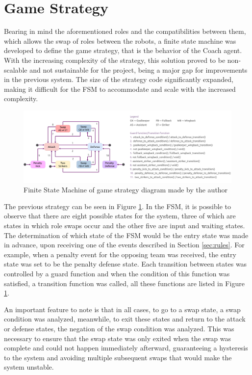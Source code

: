 \section{Game Strategy}

Bearing in mind the aforementioned roles and the compatibilities between them, which allows the swap of roles between the robots, a finite state machine was developed to define the game strategy, that is the behavior of the Coach agent. With the increasing complexity of the strategy, this solution proved to be non-scalable and not sustainable for the project, being a major gap for improvements in the previous system. The size of the strategy code significantly expanded, making it difficult for the FSM to accommodate and scale with the increased complexity.

\begin{figure}[!h]
    \centering
    \includegraphics[width=\linewidth]{chapters/target_system/images/BehaviorsController FSM.png}
    \caption{Finite State Machine of game strategy diagram made by the author}
    \label{fig:behaviors_controller_fsm}
\end{figure}

The previous strategy can be seen in Figure \ref{fig:behaviors_controller_fsm}. In the FSM, it is possible to observe that there are eight possible states for the system, three of which are states in which role swaps occur and the other five are input and waiting states. The determination of which state of the FSM would be the entry state was made in advance, upon receiving one of the events described in Section \ref{sec:rules}. For example, when a penalty event for the opposing team was received, the entry state was set to be the penalty defense state. Each transition between states was controlled by a guard function and when the condition of this function was satisfied, a transition function was called, all these functions are listed in Figure \ref{fig:behaviors_controller_fsm}.

An important feature to note is that in all cases, to go to a swap state, a swap condition was analyzed, meanwhile, to exit these states and return to the attack or defense states, the negation of the swap condition was analyzed. This was necessary to ensure that the swap state was only exited when the swap was complete and could not happen immediately afterward, guaranteeing a hysteresis to the system and avoiding multiple subsequent swaps that would make the system unstable.
